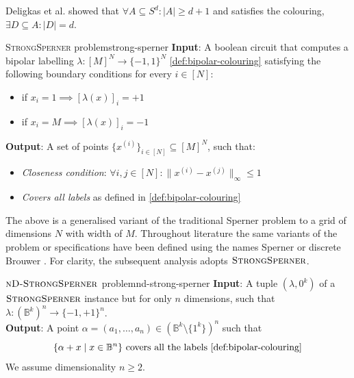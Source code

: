 Deligkas et al. \cite{deligkas_PureCircuitTightInapproximability_2024, deligkas_ConstantInapproximabilityPPA_2022} showed that
$\forall A \subseteq S^d: |A| \geq d+1$ and satisfies the colouring, $\exists D \subseteq A: |D| = d$.

\begin{definitionbox}{\textsc{StrongSperner} problem}{strong-sperner}
    \textbf{Input}: A boolean circuit that computes a bipolar labelling $\lambda: [M]^N \to \{-1, 1\}^N$ \ref{def:bipolar-colouring}
    satisfying the following boundary conditions for every $i \in [N]$:
    \begin{itemize}
        \item if $x_i = 1 \implies [\lambda(x)]_i = +1$
        \item if $x_i = M \implies [\lambda(x)]_i = -1$
    \end{itemize}
    \textbf{Output}: A set of points $\{x^{(i)}\}_{i \in [N]} \subseteq [M]^{N}$, such that:
    \begin{itemize}
        \item \textit{Closeness condition}: $\forall i,j \in [N]: \|x^{(i)} - x^{(j)}\|_{\infty} \leq 1$
        \item \textit{Covers all labels} as defined in \ref{def:bipolar-colouring}
    \end{itemize}
\end{definitionbox}

The above is a generalised variant of the traditional Sperner problem to
a grid of dimensions $N$ with width of $M$. 
Throughout literature the same variants of the problem or specifications
have been defined using the names Sperner or discrete Brouwer \cite{chen_SettlingComplexityComputing_2009, chen_Complexity2DDiscrete_2009, daskalakis_ComplexityComputingNash_2006, deligkas_PureCircuitTightInapproximability_2024}.
For clarity, the subsequent analysis adopts $\textsc{StrongSperner}$.

\begin{definitionbox}{$\textnormal{\textsc{nD-StrongSperner}}$ problem}{nd-strong-sperner}
    \textbf{Input}: A tuple $(\lambda,0^k)$ of a $\textnormal{\textsc{StrongSperner}}$ instance but for only $n$ dimensions, such that
    $\lambda : (\mathbb{B}^k)^n \to \{-1, +1\}^n$.\\
    \textbf{Output}: A point $\alpha = (a_1, \hdots, a_n) \in (\mathbb{B}^k \setminus \{1^k\})^n$ such that
    $$
    \{\alpha + x \mid x \in \mathbb{B}^n\} \text{ covers all the labels \ref{def:bipolar-colouring}}
    $$
    We assume dimensionality $n \geq 2$.
\end{definitionbox}

